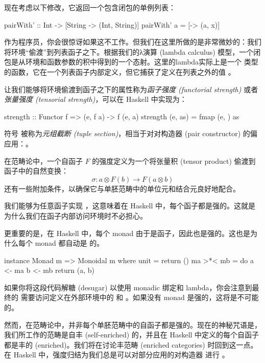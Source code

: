 \documentclass[DaoFP]{subfiles}
\begin{document}
    现在考虑以下修改，它返回一个包含闭包的单例列表：
    \begin{haskell}
        pairWith' :: Int -> [String -> (Int, String)]
        pairWith' a = [\x -> (a, x)]
    \end{haskell}
    作为程序员，你会很惊讶如果这不工作。但我们在这里所做的是非常微妙的：我们将环境``偷渡''到列表函子之下。根据我们的λ演算 (lambda calculus) 模型，一个闭包是从环境和函数参数的积中得到的一个态射。这里的lambda实际上是一个  类型的函数，它在一个列表函子内部定义，但它捕获了定义在列表之外的值 。

    让我们能够将环境偷渡到函子之下的属性称为\emph{函子强度 (functorial strength)} 或者\emph{张量强度 (tensorial strength)}，可以在 Haskell 中实现为：
    \begin{haskell}
        strength :: Functor f => (e, f a) -> f (e, a)
        strength (e, as) = fmap (e, ) as
    \end{haskell}
    符号  被称为\emph{元组截断 (tuple section)}，相当于对对构造器 (pair constructor) 的偏应用：。

    在范畴论中，一个自函子 $F$ 的强度定义为一个将张量积 (tensor product) 偷渡到函子中的自然变换：
    \[ \sigma \colon a \otimes F(b) \to F (a \otimes b) \]
    还有一些附加条件，以确保它与单胚范畴中的单位元和结合元良好地配合。

    我们能够为任意函子实现 ，这意味着在 Haskell 中，每个函子都是强的。这就是为什么我们在函子内部访问环境时不必担心。

    更重要的是，在 Haskell 中，每个 monad 由于是函子，因此也是强的。这也是为什么每个 monad 都自动是  的。
    \begin{haskell}
        instance Monad m => Monoidal m where
        unit = return ()
        ma >*< mb = do
        a <- ma
        b <- mb
        return (a, b)
    \end{haskell}
    如果你将这段代码解糖 (desugar) 以使用 monadic 绑定和 lambda，你会注意到最终的  需要访问定义在外部环境中的  和 。如果没有 monad 是强的，这将是不可能的。

    然而，在范畴论中，并非每个单胚范畴中的自函子都是强的。现在的神秘咒语是，我们所工作的范畴是自丰 (self-enriched) 的，并且在 Haskell 中定义的每个自函子都是丰的 (enriched)。我们将在讨论丰范畴 (enriched categories) 时回到这一点。在 Haskell 中，强度归结为我们总是可以对部分应用的对构造器  进行 。
\end{document}
